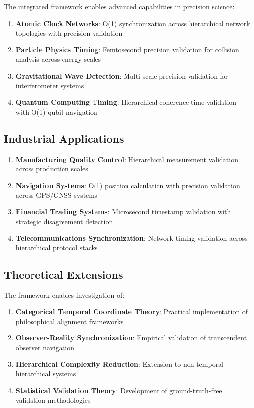 \documentclass[12pt,a4paper]{article}
\begin{document}
The integrated framework enables advanced capabilities in precision science:

\begin{enumerate}
\item \textbf{Atomic Clock Networks}: O(1) synchronization across hierarchical network topologies with precision validation
\item \textbf{Particle Physics Timing}: Femtosecond precision validation for collision analysis across energy scales
\item \textbf{Gravitational Wave Detection}: Multi-scale precision validation for interferometer systems
\item \textbf{Quantum Computing Timing}: Hierarchical coherence time validation with O(1) qubit navigation
\end{enumerate}

\subsection{Industrial Applications}

\begin{enumerate}
\item \textbf{Manufacturing Quality Control}: Hierarchical measurement validation across production scales
\item \textbf{Navigation Systems}: O(1) position calculation with precision validation across GPS/GNSS systems
\item \textbf{Financial Trading Systems}: Microsecond timestamp validation with strategic disagreement detection
\item \textbf{Telecommunications Synchronization}: Network timing validation across hierarchical protocol stacks
\end{enumerate}

\subsection{Theoretical Extensions}

The framework enables investigation of:

\begin{enumerate}
\item \textbf{Categorical Temporal Coordinate Theory}: Practical implementation of philosophical alignment frameworks
\item \textbf{Observer-Reality Synchronization}: Empirical validation of transcendent observer navigation
\item \textbf{Hierarchical Complexity Reduction}: Extension to non-temporal hierarchical systems
\item \textbf{Statistical Validation Theory}: Development of ground-truth-free validation methodologies
\end{enumerate}
\end{document}
